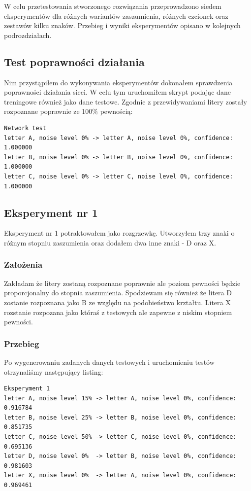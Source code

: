 \documentclass[12pt]{article}
\begin{document}
W celu przetestowania stworzonego rozwiązania przeprowadzono siedem eksperymentów dla różnych wariantów zaszumienia, różnych czcionek oraz zestawów kilku znaków. Przebieg i wyniki eksperymentów opisano w kolejnych podrozdziałach.

\subsection{Test poprawności działania}
Nim przystąpiłem do wykonywania eksperymentów dokonałem sprawdzenia poprawności działania sieci. W celu tym uruchomiłem skrypt podając dane treningowe również jako dane testowe. Zgodnie z przewidywaniami litery zostały rozpoznane poprawnie ze 100\% pewnością:

\begin{verbatim}
Network test
letter A, noise level 0% -> letter A, noise level 0%, confidence: 1.000000
letter B, noise level 0% -> letter B, noise level 0%, confidence: 1.000000
letter C, noise level 0% -> letter C, noise level 0%, confidence: 1.000000
\end{verbatim}

\subsection{Eksperyment nr 1}

Eksperyment nr 1 potraktowałem jako rozgrzewkę. Utworzyłem trzy znaki o różnym stopniu zaszumienia oraz dodałem dwa inne znaki - D oraz X.

\subsubsection{Założenia}
Zakładam że litery zostaną rozpoznane poprawnie ale poziom pewności będzie proporcjonalny do stopnia zaszumienia. Spodziewam się również że litera D zostanie rozpoznana jako B ze względu na podobieństwo krztałtu. Litera X rozstanie rozpozana jako któraś z testowych ale zapewne z niskim stopniem pewności.

\subsubsection{Przebieg}
Po wygenerowaniu zadanych danych testowych i uruchomieniu testów otrzynaliśmy następujący listing:
\begin{verbatim}
Eksperyment 1
letter A, noise level 15% -> letter A, noise level 0%, confidence: 0.916784
letter B, noise level 25% -> letter B, noise level 0%, confidence: 0.851735
letter C, noise level 50% -> letter C, noise level 0%, confidence: 0.695136
letter D, noise level 0%  -> letter B, noise level 0%, confidence: 0.981603
letter X, noise level 0%  -> letter A, noise level 0%, confidence: 0.969461
\end{verbatim}
\end{document}
